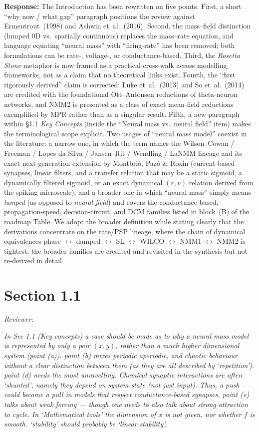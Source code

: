 \documentclass[12pt,a4paper]{article}
\newcommand{\reviewercomment}[1]{\par\smallskip\noindent\textit{Reviewer:}\par\smallskip\begingroup\itshape #1\par\endgroup\smallskip}
\newcommand{\ourresponse}[1]{\par\noindent\textbf{Response:} #1\par\medskip}
\begin{document}
\ourresponse{The Introduction has been rewritten on five points. First, a short ``why now / what gap'' paragraph positions the review against Ermentrout~(1998) and Ashwin et~al.~(2016). Second, the mass--field distinction (lumped 0D vs.\ spatially continuous) replaces the mass--rate equation, and language equating ``neural mass'' with ``firing-rate'' has been removed; both formulations can be rate-, voltage-, or conductance-based. Third, the \emph{Rosetta Stone} metaphor is now framed as a practical cross-walk across modelling frameworks, not as a claim that no theoretical links exist. Fourth, the ``first rigorously derived'' claim is corrected: Luke et~al.~(2013) and So et~al.~(2014) are credited with the foundational Ott--Antonsen reductions of theta-neuron networks, and NMM2 is presented as a class of exact mean-field reductions exemplified by MPR rather than as a singular result. Fifth, a new paragraph within §1.1 \emph{Key Concepts} (inside the ``Neural mass vs.\ neural field'' item) makes the terminological scope explicit. Two usages of ``neural mass model'' coexist in the literature: a narrow one, in which the term names the Wilson--Cowan / Freeman / Lopes da Silva / Jansen--Rit / Wendling / LaNMM lineage and its exact next-generation extension by Montbri\'o, Paz\'o \& Roxin (current-based synapses, linear filters, and a transfer relation that may be a static sigmoid, a dynamically filtered sigmoid, or an exact dynamical $(r,v)$ relation derived from the spiking microscale), and a broader one in which ``neural mass'' simply means \emph{lumped} (as opposed to \emph{neural field}) and covers the conductance-based, propagation-speed, decision-circuit, and DCM families listed in block~(B) of the roadmap Table. We adopt the broader definition while stating clearly that the derivations concentrate on the rate/PSP lineage, where the chain of dynamical equivalences phase $\leftrightarrow$ damped $\leftrightarrow$ SL $\leftrightarrow$ WILCO $\leftrightarrow$ NMM1 $\leftrightarrow$ NMM2 is tightest; the broader families are credited and revisited in the synthesis but not re-derived in detail.}

\newpage
\section*{Section 1.1}

\reviewercomment{In Sec 1.1 (Key concepts) a case should be made as to why a neural mass model is represented by only a pair $(x,y)$, rather than a much higher dimensional system (point (a)). point (b) mixes periodic aperiodic, and chaotic behaviour without a clear distinction between them (as they are all described by `repetition'). point (d) needs the most unravelling. Chemical synaptic interactions are often `shunted', namely they depend on system state (not just input). Thus, a push could become a pull in models that respect conductance-based synapses. point (e) talks about weak forcing --- though one needs to also talk about strong attraction to cycle. In `Mathematical tools' the dimension of $x$ is not given, nor whether $f$ is smooth. `stability' should probably be `linear stability'.}
\end{document}
